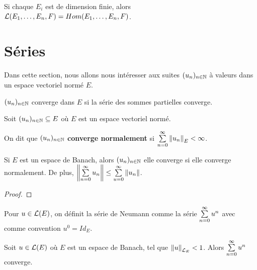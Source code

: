 \begin{proposition}
	Si chaque $E_{i}$ est de dimension finie, alors $\mathcal{L}(E_{1},
	\ldots, E_{n}, F) = Hom(E_{1}, \ldots, E_{n}, F)$.
\end{proposition}

\section{Séries}

Dans cette section, nous allons nous intéresser aux suites
$(u_{n})_{n \in \mathbb{N}}$ à valeurs dans un espace vectoriel normé $E$.

\begin{definition}
\label{definition_serie_convergence}
	$(u_{n})_{n \in \mathbb{N}}$ converge dans $E$ si
	la série des sommes partielles converge.
\end{definition}

\begin{definition}
\label{definition_serie_normal_convergence}
	Soit $(u_{n})_{n \in \mathbb{N}} \subseteq E$ où $E$ est un espace
	vectoriel normé.

	On dit que $(u_{n})_{n \in \mathbb{N}}$ \textbf{converge normalement} si
	$\sum\limits_{n = 0}^{\infty} \norm{u_{n}}_{E} < \infty$.
\end{definition}

\begin{proposition}
\label{proposition_normal_imply_convergence}
	Si $E$ est un espace de Banach, alors $(u_{n})_{n \in \mathbb{N}}$ elle
	converge si elle converge normalement. De plus,
	$\norm{\sum\limits_{n = 0}^{\infty} u_{n}} \leq \sum\limits_{u = 0}^{\infty} \norm{u_{n}}$.
\end{proposition}

\begin{proof}
	
\end{proof}

\begin{definition}
\label{definition_neumann_serie}
	Pour $u \in \mathcal{L}(E)$, on définit la série de Neumann comme la
	série $\sum\limits_{n = 0}^{\infty} u^{n}$ avec comme convention $u^{0} = Id_{E}$.
\end{definition}

\begin{proposition}
	Soit $u \in \mathcal{L}(E)$ où $E$ est un espace de Banach, tel que
	$\norm{u}_{\mathcal{L}_{E}} < 1$. Alors
	$\sum\limits_{n = 0}^{\infty} u^{n}$ converge.
\end{proposition}

